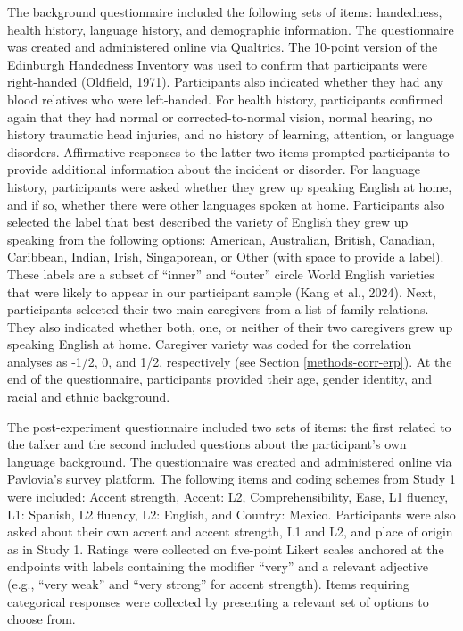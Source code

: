 \documentclass[
  12pt,
  twoside]{article}
\begin{document}
The background questionnaire included the following sets of items: handedness, health history, language history, and demographic information.
The questionnaire was created and administered online via Qualtrics.
The 10-point version of the Edinburgh Handedness Inventory was used to confirm that participants were right-handed (Oldfield, 1971).
Participants also indicated whether they had any blood relatives who were left-handed.
For health history, participants confirmed again that they had normal or corrected-to-normal vision, normal hearing, no history traumatic head injuries, and no history of learning, attention, or language disorders.
Affirmative responses to the latter two items prompted participants to provide additional information about the incident or disorder.
For language history, participants were asked whether they grew up speaking English at home, and if so, whether there were other languages spoken at home.
Participants also selected the label that best described the variety of English they grew up speaking from the following options: American, Australian, British, Canadian, Caribbean, Indian, Irish, Singaporean, or Other (with space to provide a label).
These labels are a subset of ``inner'' and ``outer'' circle World English varieties that were likely to appear in our participant sample (Kang et al., 2024).
Next, participants selected their two main caregivers from a list of family relations.
They also indicated whether both, one, or neither of their two caregivers grew up speaking English at home.
Caregiver variety was coded for the correlation analyses as -1/2, 0, and 1/2, respectively (see Section \ref{methods-corr-erp}).
At the end of the questionnaire, participants provided their age, gender identity, and racial and ethnic background.

The post-experiment questionnaire included two sets of items: the first related to the talker and the second included questions about the participant's own language background.
The questionnaire was created and administered online via Pavlovia's survey platform.
The following items and coding schemes from Study 1 were included: Accent strength, Accent: L2, Comprehensibility, Ease, L1 fluency, L1: Spanish, L2 fluency, L2: English, and Country: Mexico.
Participants were also asked about their own accent and accent strength, L1 and L2, and place of origin as in Study 1.
Ratings were collected on five-point Likert scales anchored at the endpoints with labels containing the modifier ``very'' and a relevant adjective (e.g., ``very weak'' and ``very strong'' for accent strength).
Items requiring categorical responses were collected by presenting a relevant set of options to choose from.
\end{document}
